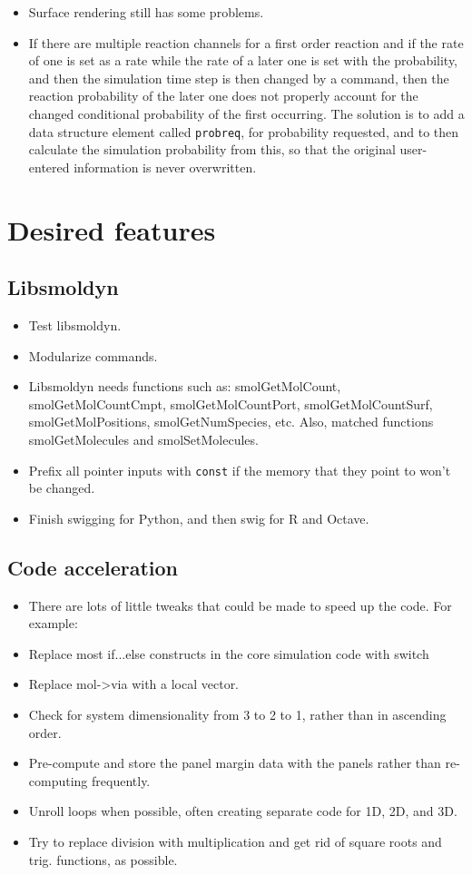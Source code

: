 \documentclass {scrbook}
\newcommand {\ttt} {\texttt}
\begin{document}
\begin{itemize}
\item Surface rendering still has some problems.
\item If there are multiple reaction channels for a first order reaction and if the rate of one is set as a rate while the rate of a later one is set with the probability, and then the simulation time step is then changed by a command, then the reaction probability of the later one does not properly account for the changed conditional probability of the first occurring. The solution is to add a data structure element called \ttt{probreq}, for probability requested, and to then calculate the simulation probability from this, so that the original user-entered information is never overwritten.
\end{itemize}

\section{Desired features}

\subsection{Libsmoldyn}
\begin{itemize}
\item Test libsmoldyn.
\item Modularize commands.
\item Libsmoldyn needs functions such as: smolGetMolCount, smolGetMolCountCmpt, smolGetMolCountPort, smolGetMolCountSurf, smolGetMolPositions, smolGetNumSpecies, etc. Also, matched functions smolGetMolecules and smolSetMolecules.
\item Prefix all pointer inputs with \ttt{const} if the memory that they point to won't be changed.
\item Finish swigging for Python, and then swig for R and Octave.
\end{itemize}

\subsection{Code acceleration}
\begin{itemize}
\item There are lots of little tweaks that could be made to speed up the code. For example:
\item Replace most if...else constructs in the core simulation code with switch
\item Replace mol->via with a local vector.
\item Check for system dimensionality from 3 to 2 to 1, rather than in ascending order.
\item Pre-compute and store the panel margin data with the panels rather than re-computing frequently.
\item Unroll loops when possible, often creating separate code for 1D, 2D, and 3D.
\item Try to replace division with multiplication and get rid of square roots and trig. functions, as possible.
\end{itemize}
\end{document}
